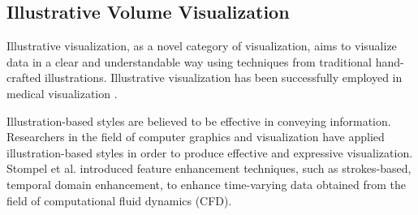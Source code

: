 
\subsection{Illustrative Volume Visualization}

Illustrative visualization, as a novel category of visualization, aims to visualize data in a clear and understandable way using techniques from traditional hand-crafted illustrations.
Illustrative visualization has been successfully employed in medical visualization \cite{svakhine_illustration_2005} \cite{viola_importance-driven_2005} \cite{svakhine_illustration-inspired_2009}.

Illustration-based styles are believed to be effective in conveying information. Researchers in the field of computer graphics and visualization have applied illustration-based styles in order to produce effective and expressive visualization. Stompel et al. \cite{stompel_visualization_2002} introduced feature enhancement techniques, such as strokes-based, temporal domain enhancement, to enhance time-varying data obtained from the field of computational fluid dynamics (CFD).

